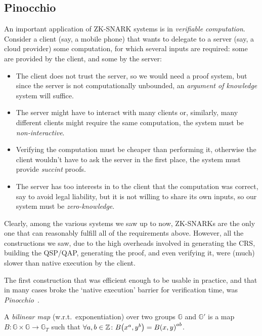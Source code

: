 \subsection{Pinocchio}
An important application of ZK-SNARK systems is in \emph{verifiable computation}.
Consider a client (say, a mobile phone) that wants to delegate to a server (say, a cloud provider) 
some computation, for which several inputs are required: some are provided by the client, 
and some by the server:
\begin{itemize}
  \item The client does not trust the server, so we would need a proof system, but since the server 
        is not computationally unbounded, an \emph{argument of knowledge} system will suffice.
  \item The server might have to interact with many clients or, similarly, many different clients
        might require the same computation, the system must be \emph{non-interactive}.
  \item Verifying the computation must be cheaper than performing it, otherwise the client wouldn't 
        have to ask the server in the first place, the system must provide \emph{succint} proofs.
  \item The server has too interests in to the client that the computation was correct, say to 
        avoid legal liability, but it is not willing to share its own inputs, so our system must
        be \emph{zero-knowledge}.
\end{itemize}
Clearly, among the various systems we saw up to now, ZK-SNARKs are the only one that can reasonably 
fulfill all of the requirements above.
However, all the constructions we saw, due to the high overheads involved in generating the CRS, 
building the QSP/QAP, generating the proof, and even verifying it, were (much) slower than native 
execution by the client.

The first construction that was efficient enough to be usable in practice, and that in many cases
broke the `native execution' barrier for verification time, was 
\emph{Pinocchio}~\cite{ParnoGHR2013}.
\begin{definition}
  A \emph{bilinear map} (w.r.t.\ exponentiation) over two groups \(\mathbb{G}\) and \(\mathbb{G}'\) 
  is a map \(B\colon \mathbb{G} \times \mathbb{G} \to \mathbb{G}_T\) such that
  \(\forall a, b \in \mathbb{Z}\colon \call{B}{x^a, y^b} = \call{B}{x, y}^{ab}\).
\end{definition}

